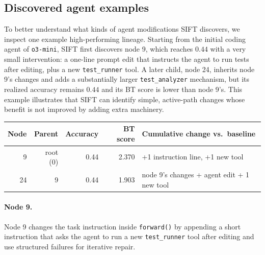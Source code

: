 \documentclass{article}
\begin{document}
\subsection{Discovered agent examples}
\label{app:interesting_agent}

To better understand what kinds of agent modifications SIFT discovers, we inspect one example high-performing lineage. Starting from the initial coding agent of \texttt{o3-mini}, SIFT first discovers node 9, which reaches $0.44$ with a very small intervention: a one-line prompt edit that instructs the agent to run tests after editing, plus a new \texttt{test\_runner} tool. A later child, node 24, inherits node 9's changes and adds a substantially larger \texttt{test\_analyzer} mechanism, but its realized accuracy remains $0.44$ and its BT score is lower than node 9's. This example illustrates that SIFT can identify simple, active-path changes whose benefit is not improved by adding extra machinery.

\begin{center}
\small
\begin{tabular}{rrrrl}
\toprule
Node & Parent & Accuracy & BT score & Cumulative change vs.\ baseline \\
\midrule
9  & root (0) & 0.44 & 2.370 & +1 instruction line, +1 new tool \\
24 & 9        & 0.44 & 1.903 & node 9's changes + agent edit + 1 new tool \\
\bottomrule
\end{tabular}
\end{center}

\paragraph{Node 9.}
Node 9 changes the task instruction inside \texttt{forward()} by appending a short instruction that asks the agent to run a new \texttt{test\_runner} tool after editing and use structured failures for iterative repair.
\end{document}
